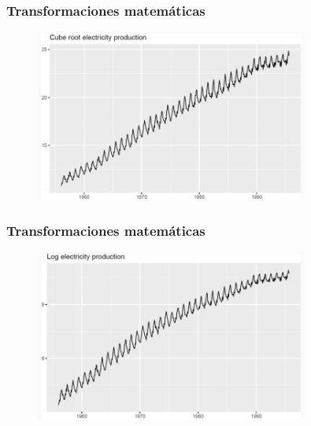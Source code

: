 \documentclass[10pt]{beamer}
\begin{document}
\begin{frame}[fragile]
\frametitle{Transformaciones matemáticas}


\begin{figure}
\begin{center}
    \includegraphics[width=0.8\textwidth]{Imagen6.JPG}
\end{center}
\end{figure}


\end{frame}





\begin{frame}[fragile]
\frametitle{Transformaciones matemáticas}


\begin{figure}
\begin{center}
    \includegraphics[width=0.8\textwidth]{Imagen7.JPG}
\end{center}
\end{figure}


\end{frame}


\end{document}
